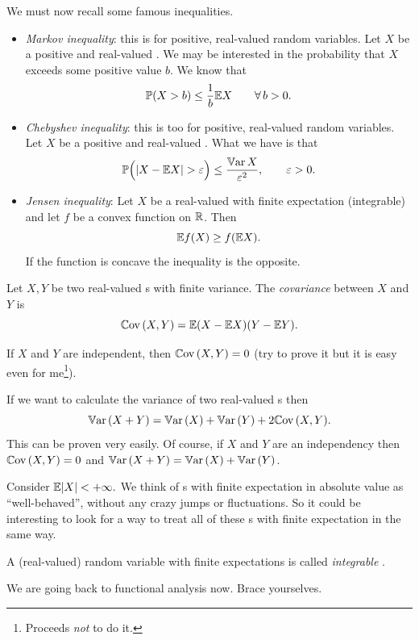 \documentclass{report}
\begin{document}
We must now recall some famous inequalities.
\begin{itemize}
	\item \emph{Markov inequality}: this is for positive, real-valued random variables. Let $X$ be a positive and real-valued \rv. We may be interested in the probability that $X$ exceeds some positive value $b$. We know that
	\[\mathbb{P}(X>b)\leq\frac{1}{b}\mathbb{E} X\qquad\forall\, b>0.\]
	\item \emph{Chebyshev inequality}: this is too for positive, real-valued random variables. Let $X$ be a positive and real-valued \rv. What we have is that
	\[\pr\Big(|X-\ev X|>\varepsilon\Big)\leq\frac{\var X}{\varepsilon^2},\qquad\varepsilon>0.\]
	\item \emph{Jensen inequality}: Let $X$ be a real-valued \rv{} with finite expectation (integrable) and let $f$ be a convex function on $\mathbb{R}$. Then
	\[\mathbb{E} f(X)\geq f(\mathbb{E} X).\]
	If the function is concave the inequality is the opposite.
\end{itemize}
\begin{definition}
	Let $X,Y$ be two real-valued \rv s with finite variance. The \emph{covariance} between $X$ and $Y$ is
	\[\mathbb{C}\mathrm{ov}\,(X,Y)=\mathbb{E} (X-\mathbb{E} X)(Y-\mathbb{E} Y).\]
\end{definition}
If $X$ and $Y$ are independent, then $\mathbb{C}\mathrm{ov}\,(X,Y)=0$ (try to prove it but it is easy even for me\footnote{Proceeds \textit{not} to do it.}).
\begin{remark}
	If we want to calculate the variance of two real-valued \rv s then
	\[\mathbb{V}\mathrm{ar}\,(X+Y)=\mathbb{V}\mathrm{ar}\,(X)+\mathbb{V}\mathrm{ar}\,(Y)+2\mathbb{C}\mathrm{ov}\,(X,Y).\]
	This can be proven very easily. Of course, if $X$ and $Y$ are an independency then $\mathbb{C}\mathrm{ov}\,(X,Y)=0$ and $\mathbb{V}\mathrm{ar}\,(X+Y)=\mathbb{V}\mathrm{ar}\,(X)+\mathbb{V}\mathrm{ar}\,(Y)$.
\end{remark}
Consider $\mathbb{E} |X|<+\infty.$ We think of \rv s with finite expectation in absolute value as ``well-behaved'', without any crazy jumps or fluctuations. So it could be interesting to look for a way to treat all of these \rv s with finite expectation in the same way.
\begin{remark}
	A \rv{} (real-valued) random variable with finite expectations is called \emph{integrable \rv}.
\end{remark}
We are going back to functional analysis now. Brace yourselves.
\end{document}
